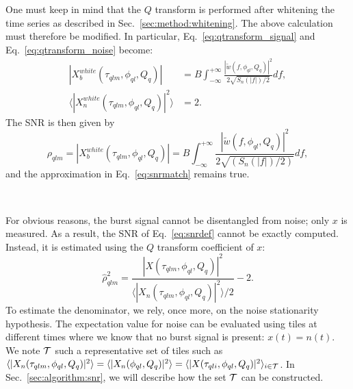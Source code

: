 One must keep in mind that the $Q$ transform is performed after whitening the time series as described in Sec.~\ref{sec:method:whitening}. The above calculation must therefore be modified. In particular, Eq.~\ref{eq:qtransform_signal} and Eq.~\ref{eq:qtransform_noise} become:
\begin{align}
  |X^{white}_b(\tau_{qlm}, \phi_{ql}, Q_q)| &= B \int_{-\infty}^{+\infty}{\frac{|\tilde{w}(f,\phi_{ql},Q_q)|^2}{2\sqrt{S_n(|f|)/2}}df}, \\
  \langle |X^{white}_n(\tau_{qlm}, \phi_{ql}, Q_q)|^2 \rangle &= 2.
  \label{eq:qtransform_whitened}
\end{align}
The SNR is then given by
\begin{equation}
  \rho_{qlm} = |X^{white}_b(\tau_{qlm}, \phi_{ql}, Q_q)| = B \int_{-\infty}^{+\infty}{\frac{|\tilde{w}(f,\phi_{ql},Q_q)|^2}{2\sqrt{(S_n(|f|)/2)}}df},
  \label{eq:snr_white}
\end{equation}
and the approximation in Eq.~\ref{eq:snrmatch} remains true.

~

For obvious reasons, the burst signal cannot be disentangled from noise; only $x$ is measured. As a result, the SNR of Eq.~\ref{eq:snrdef} cannot be exactly computed. Instead, it is estimated using the $Q$ transform coefficient of $x$:
\begin{equation}
  \hat{\rho}_{qlm}^2 =  \frac{|X(\tau_{qlm}, \phi_{ql}, Q_q)|^2}{\langle |X_n(\tau_{qlm}, \phi_{ql}, Q_q)|^2 \rangle/2}-2 . \label{eq:snrestimator}
\end{equation}
To estimate the denominator, we rely, once more, on the noise stationarity hypothesis. The expectation value for noise can be evaluated using tiles at different times where we know that no burst signal is present: $x(t)=n(t)$. We note $\cal{T}$ such a representative set of tiles such as $\langle |X_n(\tau_{qlm}, \phi_{ql}, Q_q)|^2 \rangle = \langle |X_n(\phi_{ql}, Q_q)|^2 \rangle = \langle |X(\tau_{qli}, \phi_{ql}, Q_q)|^2 \rangle_{i\in \cal{T}}$. In Sec.~\ref{sec:algorithm:snr}, we will describe how the set $\cal{T}$ can be constructed.

